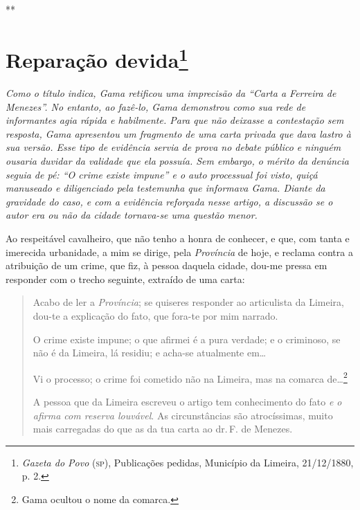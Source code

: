 \medskip

\hfill***
\pagebreak
\section{Reparação devida\protect\footnote{\emph{\MakeUppercase{G}azeta do \MakeUppercase{P}ovo} (\textsc{sp}),
  \MakeUppercase{P}ublicações pedidas, \MakeUppercase{M}unicípio da \MakeUppercase{L}imeira, 21/12/1880, p. 2.}}

\begin{resumo}
\emph{Como o título indica, Gama retificou uma imprecisão da ``Carta a
Ferreira de Menezes''. No entanto, ao fazê-lo, Gama demonstrou como
sua rede de informantes agia rápida e habilmente. Para que não deixasse
a contestação sem resposta, Gama apresentou um fragmento de uma carta
privada que dava lastro à sua versão. Esse tipo de evidência servia de
prova no debate público e ninguém ousaria duvidar da validade que ela
possuía. Sem embargo, o mérito da denúncia seguia de pé: ``O crime existe
impune'' e o auto processual foi visto, quiçá manuseado e diligenciado
pela testemunha que informava Gama. Diante da gravidade do caso, e com a
evidência reforçada nesse artigo, a discussão se o autor era ou não da
cidade tornava-se uma questão menor. }
\end{resumo}

Ao respeitável cavalheiro, que não tenho a honra de conhecer, e que, com
tanta e imerecida urbanidade, a mim se dirige, pela \emph{Província} de
hoje, e reclama contra a atribuição de um crime, que fiz, à pessoa
daquela cidade, dou-me pressa em responder com o trecho seguinte,
extraído de uma carta:

\noindent\dotfill{}

\begin{quote}
Acabo de ler a \emph{Província}; se quiseres responder ao articulista
da Limeira, dou-te a explicação do fato, que fora-te por mim narrado.

O crime existe impune; o que afirmei é a pura verdade; e o criminoso, se
não é da Limeira, lá residiu; e acha-se atualmente em\ldots{}

Vi o processo; o crime foi cometido não na Limeira, mas na comarca
de\ldots{}\footnote{Gama ocultou o nome da comarca.}

A pessoa que da Limeira
escreveu o artigo tem conhecimento do fato \emph{e o afirma com reserva
louvável}. As circunstâncias são atrocíssimas, muito mais carregadas do
que as da tua carta ao dr.\,F. de Menezes.
\end{quote}

